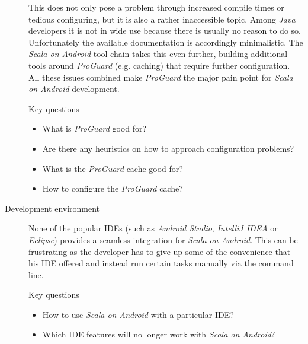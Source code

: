 \begin{description}
	This does not only pose a problem through increased compile times or tedious configuring, but it is also a rather inaccessible topic. Among \textit{Java} developers it is not in wide use because there is usually no reason to do so. Unfortunately the available documentation is accordingly minimalistic. The \textit{Scala on Android} tool-chain takes this even further, building additional tools around \textit{ProGuard} (e.g. caching) that require further configuration. All these issues combined make \textit{ProGuard} the major pain point for \textit{Scala on Android} development.

	\begin{highlight}{Key questions}

		\begin{itemize}

			\item What is \textit{ProGuard} good for?

			\item Are there any heuristics on how to approach configuration problems?

			\item What is the \textit{ProGuard} cache good for?

			\item How to configure the \textit{ProGuard} cache?

		\end{itemize}

	\end{highlight}

	\item[Development environment]\hfill

	None of the popular \acp{IDE} (such as \textit{Android Studio}, \textit{IntelliJ IDEA} or \textit{Eclipse}) provides a seamless integration for \textit{Scala on Android}. This can be frustrating as the developer has to give up some of the convenience that his \ac{IDE} offered and instead run certain tasks manually via the command line.

	\begin{highlight}{Key questions}

		\begin{itemize}

			\item How to use \textit{Scala on Android} with a particular \ac{IDE}?

			\item Which \ac{IDE} features will no longer work with \textit{Scala on Android}?


\end{itemize}
\end{highlight}
\end{description}
